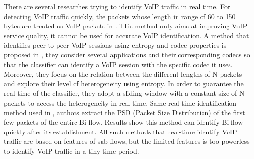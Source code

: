 \documentclass[conference]{IEEEtran}
\begin{document}
There are several researches trying to identify VoIP traffic in real time. For detecting VoIP traffic quickly, the packets whose length in range of 60 to 150 bytes are treated as VoIP packets in \cite{3}. This method only aims at improving VoIP service quality, it cannot be used for accurate VoIP identification. A method that identifies peer-to-peer VoIP sessions using entropy and codec properties is proposed in \cite{4}, they consider several applications and their corresponding codecs so that the classifier can identify a VoIP session with the specific codec it uses. Moreover, they focus on the relation between the different lengths of N packets and explore their level of heterogeneity using entropy. In order to guarantee the real-time of the classifier, they adopt a sliding window with a constant size of N packets to access the heterogeneity in real time. Same real-time identification method used in \cite{22}, authors extract the PSD (Packet Size Distribution) of the first few packets of the entire Bi-flow. Results show this method can identify Bi-flow quickly after its establishment. All such methods that real-time identify VoIP traffic are based on features of sub-flows, but the limited features is too powerless to identify VoIP traffic in a tiny time period.


\end{document}

